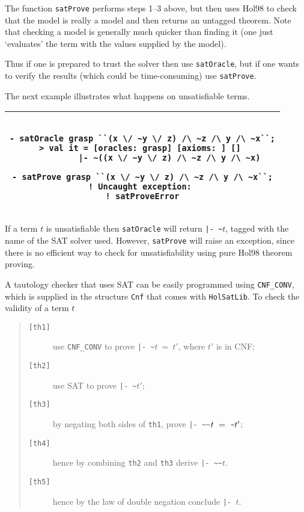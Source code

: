 \documentclass[12pt]{article}
\makeatletter
\renewcommand{\t}[1]{\mbox{\small\tt #1}}
\newcommand\Hol{Hol98\xspace}
\newlength{\hsbw}
\newcommand\MLSpacing{13pt}
\newenvironment{session}{\begin{flushleft}
 \begin{tabular}{@{}|c@{}|@{}}\hline 
 \begin{minipage}[b]{\hsbw}
 \begingroup\small\baselineskip\MLSpacing}{\endgroup\end{minipage}\\ \hline 
 \end{tabular}
 \end{flushleft}}
\makeatother
\begin{document}
The function \t{satProve} performs steps 1--3 above, but then uses
\Hol to check that the model is really a model and then
returns an untagged theorem. Note that checking a model is
generally much quicker than finding it (one just `evaluates' the term
with the values supplied by the model).

Thus if one is prepared to trust the solver then use \t{satOracle},
but if one wants to verify the results (which could be time-consuming)
use \t{satProve}.


The next example illustrates what happens on unsatisfiable terms.

\begin{session}\begin{verbatim}

- satOracle grasp ``(x \/ ~y \/ z) /\ ~z /\ y /\ ~x``;
> val it = [oracles: grasp] [axioms: ] [] 
           |- ~((x \/ ~y \/ z) /\ ~z /\ y /\ ~x)

- satProve grasp ``(x \/ ~y \/ z) /\ ~z /\ y /\ ~x``;
! Uncaught exception: 
! satProveError

\end{verbatim}\end{session}

If a term $t$ is unsatisfiable then \t{satOracle} will return {\small\verb+|- ~+}$t$,
tagged with the name of the SAT solver used. However, \t{satProve} will raise an exception,
since there is no efficient way to check for unsatisfiability using pure \Hol
theorem proving.

A tautology checker that uses SAT can be easily programmed using
\t{CNF\_CONV}, which is supplied in the structure \t{Cnf} that comes
with \t{HolSatLib}. To check the validity of a term $t$

\begin{quote}
\begin{description}
\item[\t{[th1]}] use \t{CNF\_CONV} to prove {\small\verb+|- ~+}$t~=~t'$, where $t'$ is in CNF;
\item[\t{[th2]}] use SAT to prove  {\small\verb+|- ~+}$t'$;
\item[\t{[th3]}] by negating both sides of \t{th1}, prove {\small\verb+|- ~~+}$t~=~{\small\verb+~+}t'$;
\item[\t{[th4]}] hence by combining \t{th2} and \t{th3} derive {\small\verb+|- ~~+}$t$.
\item[\t{[th5]}] hence by the law of double negation conclude {\small\verb+|- +}$t$.
\end{description}
\end{quote}
\end{document}
